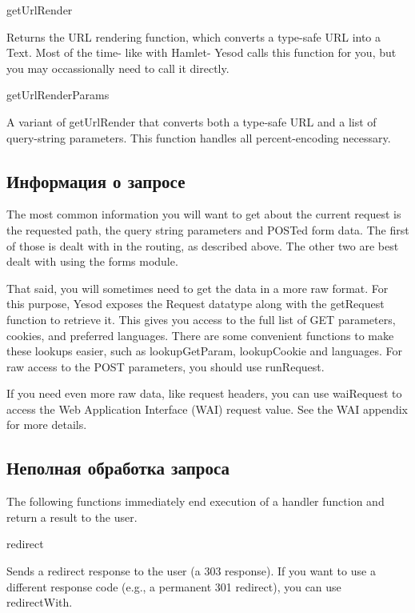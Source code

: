 getUrlRender

Returns the URL rendering function, which converts a type-safe URL
into a Text. Most of the time- like with Hamlet- Yesod calls this
function for you, but you may occassionally need to call it directly.

getUrlRenderParams

A variant of getUrlRender that converts both a type-safe URL and a
list of query-string parameters. This function handles all
percent-encoding necessary.

\subsection{Информация о запросе}

The most common information you will want to get about the current
request is the requested path, the query string parameters and POSTed
form data. The first of those is dealt with in the routing, as
described above. The other two are best dealt with using the forms
module.

That said, you will sometimes need to get the data in a more raw
format. For this purpose, Yesod exposes the Request datatype along
with the getRequest function to retrieve it. This gives you access to
the full list of GET parameters, cookies, and preferred
languages. There are some convenient functions to make these lookups
easier, such as lookupGetParam, lookupCookie and languages. For raw
access to the POST parameters, you should use runRequest.

If you need even more raw data, like request headers, you can use
waiRequest to access the Web Application Interface (WAI) request
value. See the WAI appendix for more details.

\subsection{Неполная обработка запроса}

The following functions immediately end execution of a handler
function and return a result to the user.

redirect

Sends a redirect response to the user (a 303 response). If you want to
use a different response code (e.g., a permanent 301 redirect), you
can use redirectWith.


